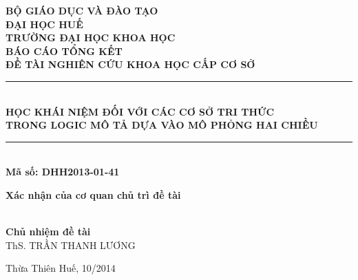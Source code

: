 \documentclass[12pt,a4paper,twoside]{report}
\theoremstyle{definition}
\newcommand{\HRule}{\rule{\linewidth}{0.6mm}}
\begin{document}
\begin{titlepage}
	\begin{adjustwidth}{-10pt}{-10pt}
	\begin{center}
		\textsc{\textbf{BỘ GIÁO DỤC VÀ ĐÀO TẠO}}\\[0.0cm]
		\textsc{\textbf{ĐẠI HỌC HUẾ}}\\[0.0cm]
		{\textbf{TRƯỜNG ĐẠI HỌC KHOA HỌC}}\\[5.6cm]
				
		\textsc{\Large \textbf{BÁO CÁO TỔNG KẾT}}\\[0.3cm]
		\textsc{\large \textbf{ĐỀ TÀI NGHIÊN CỨU KHOA HỌC CẤP CƠ SỞ}}\\[0.3cm]
		\HRule \\[0.5cm]
		{\large {\bf HỌC KHÁI NIỆM ĐỐI VỚI CÁC CƠ SỞ TRI THỨC\\
			TRONG LOGIC MÔ TẢ DỰA VÀO MÔ PHỎNG HAI CHIỀU}}\\[0.4cm]
		\HRule \\[0.3cm]
		\textbf{Mã số: DHH2013-01-41}
		\\[1.5cm]

		\begin{minipage}{0.5\textwidth}
		\begin{center}
		{\bf Xác nhận của cơ quan chủ trì đề tài}\\[2.5cm]
		{\ }
		\end{center}
		\end{minipage}
		\begin{minipage}{0.45\textwidth}
		\begin{center}
		{\bf Chủ nhiệm đề tài} \\[2.5cm]
		{ThS. TRẦN THANH LƯƠNG}\\
		\end{center}
		\end{minipage}		
		\vfill
		Thừa Thiên Huế, 10/2014
		\vspace{-5ex}
	\end{center}
	\end{adjustwidth}
\end{titlepage}
\newpage
\thispagestyle{empty}
\mbox{}
\addtocounter{page}{-1}
\newpage
\setcounter{tocdepth}{2}
\renewcommand\contentsname{MỤC LỤC}
\tableofcontents

\newpage
\thispagestyle{empty}
\mbox{}
\addtocounter{page}{-1}
\newpage
\end{document}
